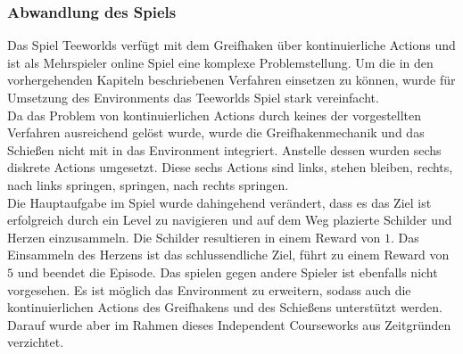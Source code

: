 \documentclass[11pt]{scrartcl}
\begin{document}
\subsubsection{Abwandlung des Spiels}
Das Spiel Teeworlds verfügt mit dem Greifhaken über kontinuierliche Actions und ist als
Mehrspieler online Spiel eine komplexe Problemstellung. Um die in den vorhergehenden
Kapiteln beschriebenen Verfahren einsetzen zu können, wurde für Umsetzung des Environments
das Teeworlds Spiel stark vereinfacht.\\
Da das Problem von kontinuierlichen Actions durch keines der vorgestellten Verfahren
ausreichend gelöst wurde, wurde die Greifhakenmechanik und das Schießen nicht mit in das
Environment integriert. Anstelle dessen wurden sechs diskrete Actions umgesetzt. Diese
sechs Actions sind \grqq links\grqq, \grqq stehen bleiben\grqq, \grqq rechts\grqq, \grqq
nach links springen\grqq, \grqq springen\grqq, \grqq nach rechts springen\grqq.\\
Die Hauptaufgabe im Spiel wurde dahingehend verändert, dass es das Ziel ist erfolgreich
durch ein Level zu navigieren und auf dem Weg plazierte Schilder und Herzen einzusammeln.
Die Schilder resultieren in einem Reward von $1$. Das Einsammeln des Herzens ist das
schlussendliche Ziel, führt zu einem Reward von $5$ und beendet die Episode. Das spielen
gegen andere Spieler ist ebenfalls nicht vorgesehen. Es ist möglich das Environment zu
erweitern, sodass auch die kontinuierlichen Actions des Greifhakens und des Schießens
unterstützt werden. Darauf wurde aber im Rahmen dieses Independent Courseworks aus
Zeitgründen verzichtet. %
\end{document}
